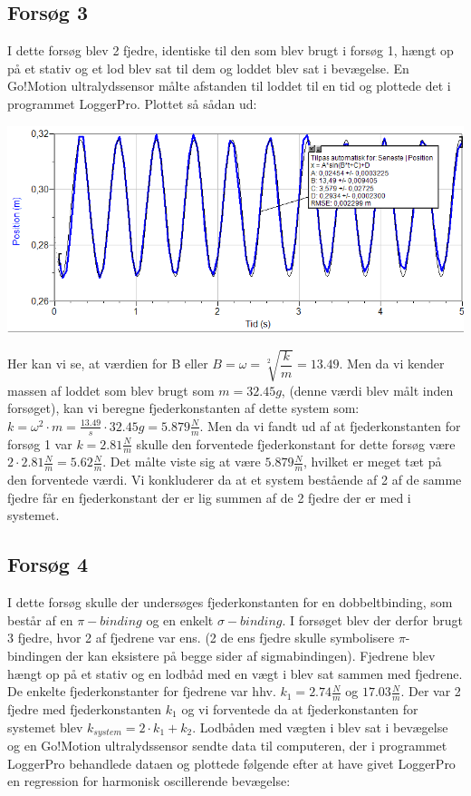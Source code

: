 \subsection{Forsøg 3}
I dette forsøg blev 2 fjedre, identiske til den som blev brugt i forsøg 1, hængt op på et stativ og et lod blev sat til dem og loddet blev sat i bevægelse. En Go!Motion ultralydssensor målte afstanden til loddet til en tid og plottede det i programmet LoggerPro. Plottet så sådan ud:

\begin{center}
\includegraphics[scale=0.7]{Billeder/graf3}
\end{center}

Her kan vi se, at værdien for B eller $B = \omega = \sqrt[2]{\dfrac{k}{m}}=13.49$. Men da vi kender massen af loddet som blev brugt som $m=32.45g$, (denne værdi blev målt inden forsøget), kan vi beregne fjederkonstanten af dette system som:
$k=\omega^2 \cdot m = \frac{13.49}{s} \cdot 32.45g = 5.879 \frac{N}{m}$. Men da vi fandt ud af at fjederkonstanten for forsøg 1 var $k=2.81\frac{N}{m}$ skulle den forventede fjederkonstant for dette forsøg være $2 \cdot 2.81 \frac{N}{m}= 5.62 \frac{N}{m}$. Det målte viste sig at være $5.879 \frac{N}{m}$, hvilket er meget tæt på den forventede værdi. Vi konkluderer da at et system bestående af 2 af de samme fjedre får en fjederkonstant der er lig summen af de 2 fjedre der er med i systemet. 

\subsection{Forsøg 4}
I dette forsøg skulle der undersøges fjederkonstanten for en dobbeltbinding, som består af en $\pi-binding$ og en enkelt $\sigma-binding$. I forsøget blev der derfor brugt 3 fjedre, hvor 2 af fjedrene var ens. (2 de ens fjedre skulle symbolisere $\pi$-bindingen der kan eksistere på begge sider af sigmabindingen). Fjedrene blev hængt op på et stativ og en lodbåd med en vægt i blev sat sammen med fjedrene. De enkelte fjederkonstanter for fjedrene var hhv. $k_1 = 2.74 \frac{N}{m} $ og $17.03 \frac{N}{m}$. Der var 2 fjedre med fjederkonstanten $k_1$ og vi forventede da at fjederkonstanten for systemet blev $k_{system}= 2 \cdot k_1 + k_2$. Lodbåden med vægten i blev sat i bevægelse og en Go!Motion ultralydssensor sendte data til computeren, der i programmet LoggerPro behandlede dataen og plottede følgende efter at have givet LoggerPro en regression for harmonisk oscillerende bevægelse:

